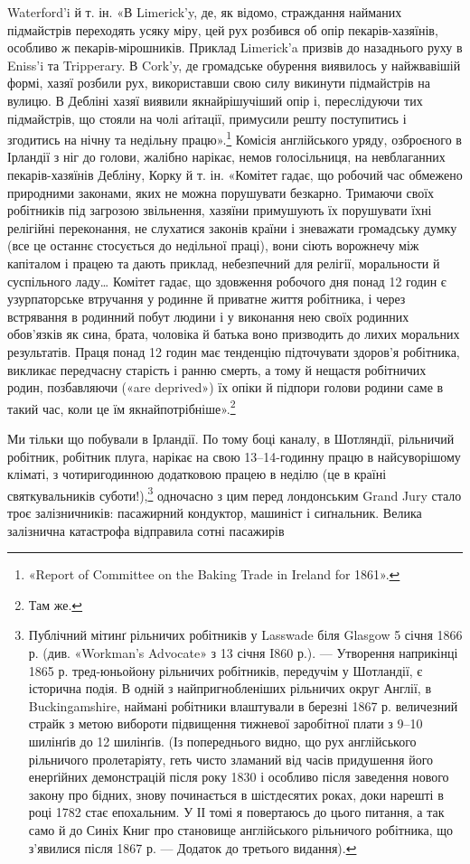 \parcont{}  %
Waterford’i й т. ін. «В Limerick’y, де, як відомо, страждання
найманих підмайстрів переходять усяку міру, цей рух розбився
об опір пекарів-хазяїнів, особливо ж пекарів-мірошників. Приклад
Limerick’a призвів до назаднього руху в Eniss’i та Tripperary.
В Cork’y, де громадське обурення виявилось у найжвавішій
формі, хазяї розбили рух, використавши свою силу викинути підмайстрів
на вулицю. В Дебліні хазяї виявили якнайрішучіший
опір і, переслідуючи тих підмайстрів, що стояли на чолі аґітації,
примусили решту поступитись і згодитись на нічну та недільну
працю».\footnote{
«Report of Committee on the Baking Trade in Ireland for 1861».
} Комісія англійського уряду, озброєного в Ірландії
з ніг до голови, жалібно нарікає, немов голосільниця, на невблаганних
пекарів-хазяїнів Дебліну, Корку й т. ін. «Комітет гадає,
що робочий час обмежено природними законами, яких не можна
порушувати безкарно. Тримаючи своїх робітників під загрозою
звільнення, хазяїни примушують їх порушувати їхні релігійні
переконання, не слухатися законів країни і зневажати громадську
думку (все це останнє стосується до недільної праці), вони сіють
ворожнечу між капіталом і працею та дають приклад, небезпечний
для релігії, моральности й суспільного ладу\dots{} Комітет гадає,
що здовження робочого дня понад 12 годин є узурпаторське втручання
у родинне й приватне життя робітника, і через встрявання
в родинний побут людини і у виконання нею своїх родинних обов’язків
як сина, брата, чоловіка й батька воно призводить до лихих
моральних результатів. Праця понад 12 годин має тенденцію підточувати
здоров’я робітника, викликає передчасну старість і
ранню смерть, а тому й нещастя робітничих родин, позбавляючи
(«are deprived») їх опіки й підпори голови родини саме в такий
час, коли це їм якнайпотрібніше».\footnote{Там же.}

Ми тільки що побували в Ірландії. По тому боці каналу, в
Шотляндії, рільничий робітник, робітник плуга, нарікає на свою
13--14-годинну працю в найсуворішому кліматі, з чотиригодинною
додатковою працею в неділю (це в країні святкувальників
суботи!),\footnote{
Публічний мітинґ рільничих робітників у Lasswade біля Glasgow
5 січня 1866 р. (див. «Workman’s Advocate» з 13 січня I860 р.). — Утворення
наприкінці 1865 р. тред-юньойону рільничих робітників, передучім
у Шотландії, є історична подія. В одній з найпригнобленіших рільничих
округ Англії, в Buckingamshire, наймані робітники влаштували
в березні 1867 р. величезний страйк з метою вибороти підвищення тижневої
заробітної плати з 9--10 шилінґів до 12 шилінґів. (Із попереднього
видно, що рух англійського рільничого пролетаріяту, геть чисто зламаний
від часів придушення його енерґійних демонстрацій після року 1830
і особливо після заведення нового закону про бідних, знову починається
в шістдесятих роках, доки нарешті в році 1782 стає епохальним. У ІІ томі
я повертаюсь до цього питання, а так само й до Синіх Книг про становище
англійського рільничого робітника, що з’явилися після 1867 р. — Додаток
до третього видання).
} одночасно з цим перед лондонським Grand Jury стало
троє залізничників: пасажирний кондуктор, машиніст і сиґнальник.
Велика залізнична катастрофа відправила сотні пасажирів
\parbreak{}  %
